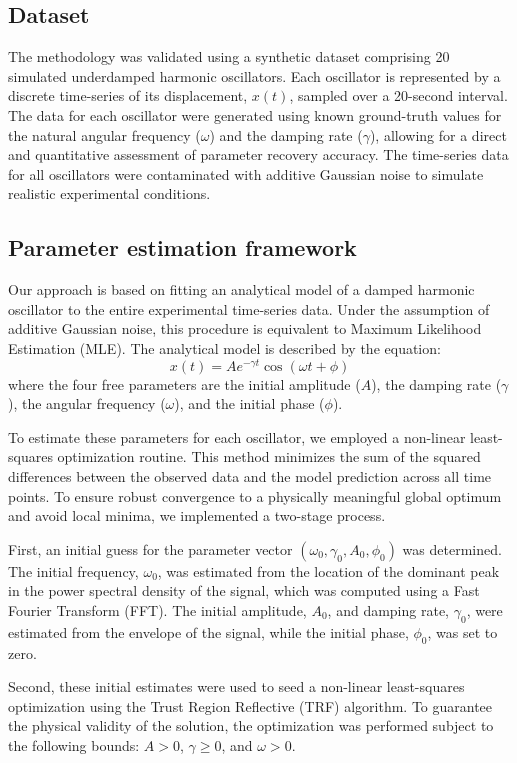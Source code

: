 \documentclass[]{article}
\begin{document}
\subsection{Dataset}
The methodology was validated using a synthetic dataset comprising 20 simulated underdamped harmonic oscillators. Each oscillator is represented by a discrete time-series of its displacement, $x(t)$, sampled over a 20-second interval. The data for each oscillator were generated using known ground-truth values for the natural angular frequency ($\omega$) and the damping rate ($\gamma$), allowing for a direct and quantitative assessment of parameter recovery accuracy. The time-series data for all oscillators were contaminated with additive Gaussian noise to simulate realistic experimental conditions.

\subsection{Parameter estimation framework}
Our approach is based on fitting an analytical model of a damped harmonic oscillator to the entire experimental time-series data. Under the assumption of additive Gaussian noise, this procedure is equivalent to Maximum Likelihood Estimation (MLE). The analytical model is described by the equation:
\begin{equation}
x(t) = A e^{-\gamma t} \cos(\omega t + \phi)
\end{equation}
where the four free parameters are the initial amplitude ($A$), the damping rate ($\gamma$), the angular frequency ($\omega$), and the initial phase ($\phi$).

To estimate these parameters for each oscillator, we employed a non-linear least-squares optimization routine. This method minimizes the sum of the squared differences between the observed data and the model prediction across all time points. To ensure robust convergence to a physically meaningful global optimum and avoid local minima, we implemented a two-stage process.

First, an initial guess for the parameter vector $(\omega_0, \gamma_0, A_0, \phi_0)$ was determined. The initial frequency, $\omega_0$, was estimated from the location of the dominant peak in the power spectral density of the signal, which was computed using a Fast Fourier Transform (FFT). The initial amplitude, $A_0$, and damping rate, $\gamma_0$, were estimated from the envelope of the signal, while the initial phase, $\phi_0$, was set to zero.

Second, these initial estimates were used to seed a non-linear least-squares optimization using the Trust Region Reflective (TRF) algorithm. To guarantee the physical validity of the solution, the optimization was performed subject to the following bounds: $A > 0$, $\gamma \ge 0$, and $\omega > 0$.
\end{document}
